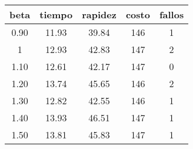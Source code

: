 \begin{table}[h!]
\centering
\begin{tabular}{ccccc}
beta & tiempo & rapidez & costo & fallos \\ 
\hline 
0.90 & 11.93 & 39.84 & 146 & 1 \\ 
1 & 12.93 & 42.83 & 147 & 2 \\ 
1.10 & 12.61 & 42.17 & 147 & 0 \\ 
1.20 & 13.74 & 45.65 & 146 & 2 \\ 
1.30 & 12.82 & 42.55 & 146 & 1 \\ 
1.40 & 13.93 & 46.51 & 147 & 1 \\ 
1.50 & 13.81 & 45.83 & 147 & 1 \\ 
\hline 
\end{tabular}
\end{table}